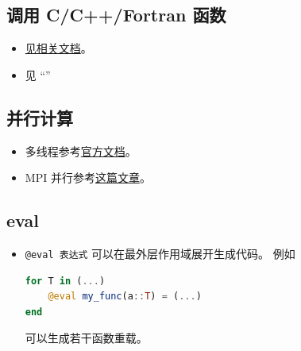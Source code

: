 \subsection{调用 C/C++/Fortran 函数}
\begin{itemize}
\item \href{https://docs.julialang.org/en/v1/manual/calling-c-and-fortran-code/}{见相关文档}。
\item 见 “”
\end{itemize}

\subsection{并行计算}
\begin{itemize}
\item 多线程参考\href{https://docs.julialang.org/en/v1/manual/multi-threading/}{官方文档}。
\item MPI 并行参考\href{http://www.claudiobellei.com/2018/09/30/julia-mpi/}{这篇文章}。
\end{itemize}

\subsection{eval}
\begin{itemize}
\item \verb`@eval 表达式` 可以在最外层作用域展开生成代码。 例如
\begin{lstlisting}[language=julia]
for T in (...)
    @eval my_func(a::T) = (...)
end
\end{lstlisting}
可以生成若干函数重载。
\end{itemize}


